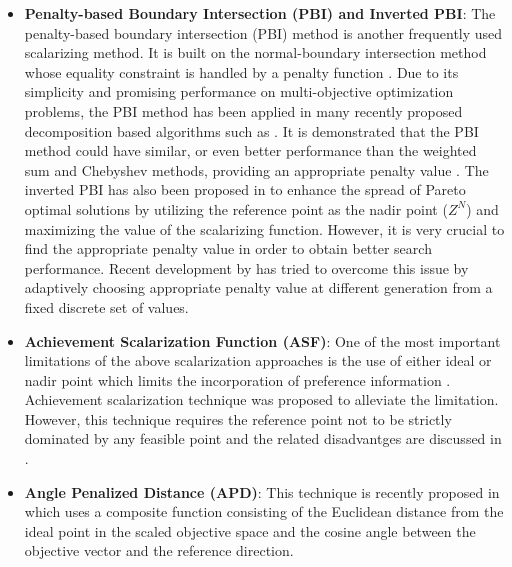 \documentclass{sig-alternate}
\begin{document}
\begin{itemize}
	\item \textbf{Penalty-based Boundary Intersection (PBI) and Inverted PBI}: The penalty-based boundary intersection (PBI) method is another frequently used scalarizing method. It is built on the normal-boundary intersection method \cite{das1998normal} whose equality constraint is handled by a penalty function \cite{zhang2007moead}. Due to its simplicity and promising performance on multi-objective optimization problems, the PBI method has been applied in many recently proposed decomposition based algorithms such as \cite{li2015pbi}. It is demonstrated that the PBI method could have similar, or even better performance than the weighted sum and Chebyshev methods, providing an appropriate penalty value \cite{sato2014inverted}. The inverted PBI has also been proposed in \cite{sato2014inverted} to enhance the spread of Pareto optimal solutions by utilizing the reference point as the nadir point ($Z^N$) and maximizing the value of the scalarizing function. However, it is very crucial to find the appropriate penalty value in order to obtain better search performance. Recent development by \cite{wang2017pbi} has tried to overcome this issue by adaptively choosing appropriate penalty value at different generation from a fixed discrete set of values. 
	\item \textbf{Achievement Scalarization Function (ASF)}: One of the most important limitations of the above scalarization approaches is the use of either ideal or nadir point which limits the incorporation of preference information \cite{nikulin2012asf}. Achievement scalarization technique was proposed \cite{wierzbicki1980use} to alleviate the limitation. However, this technique requires the reference point not to be strictly dominated by any feasible point and the related disadvantges are discussed in \cite{nikulin2012asf}. 
	\item \textbf{Angle Penalized Distance (APD)}: This technique is recently proposed in \cite{Cheng2016many} which uses a composite function consisting of the Euclidean distance from the ideal point in the scaled objective space and the cosine angle between the objective vector and the reference direction.   
\end{itemize} 
\end{document}
